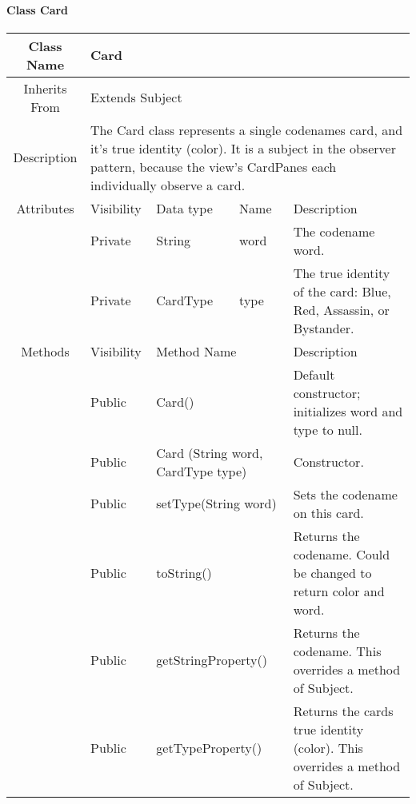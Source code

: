 \paragraph{Class Card}\mbox{}
\begin{tabularx}{\textwidth}{|c||l|l|l|X|}
    \hline
    \cellcolor{lightgray}Class Name & \multicolumn{4}{X|}{Card}\\
    \hline
    \cellcolor{lightgray}Inherits From & \multicolumn{4}{X|}{Extends Subject}\\
    \hline
    \cellcolor{lightgray}Description & \multicolumn{4}{p{12cm}|}{The Card class represents a single codenames card, and it's true identity (color). It is a subject in the observer pattern, because the view's CardPanes each individually observe a card.}\\
    \hline\hline
    \cellcolor{lightgray}Attributes & \cellcolor{lightgray}Visibility & \cellcolor{lightgray}Data type & \cellcolor{lightgray}Name & \cellcolor{lightgray}Description\\\cline{2-5}
    \cellcolor{lightgray} & Private & String & word & The codename word.\\
    \hline
    \cellcolor{lightgray} & Private & CardType & type & The true identity of the card: Blue, Red, Assassin, or Bystander.\\
    \hline\hline
    \cellcolor{lightgray}Methods & \cellcolor{lightgray}Visibility & \multicolumn{2}{l|}{\cellcolor{lightgray}Method Name} & \cellcolor{lightgray}Description\\\cline{2-5}
    \cellcolor{lightgray} & Public & \multicolumn{2}{l|}{Card()} & Default constructor; initializes word and type to null.\\
    \hline
    \cellcolor{lightgray} & Public & \multicolumn{2}{X|}{Card (String word, CardType type)} & Constructor.\\
    \hline
    \cellcolor{lightgray} & Public & \multicolumn{2}{l|}{setType(String word)} & Sets the codename on this card. \\
    \hline
    \cellcolor{lightgray} & Public & \multicolumn{2}{l|}{toString()} & Returns the codename. Could be changed to return color and word. \\
    \hline
    \cellcolor{lightgray} & Public & \multicolumn{2}{l|}{getStringProperty()} & Returns the codename. This overrides a method of Subject. \\
    \hline
    \cellcolor{lightgray} & Public & \multicolumn{2}{l|}{getTypeProperty()} & Returns the cards true identity (color). This overrides a method of Subject. \\
    \hline
\end{tabularx}
